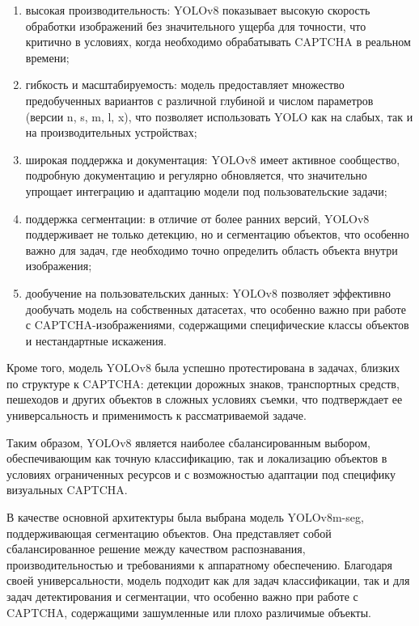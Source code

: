 \begin{enumerate}
    \item высокая производительность: YOLOv8 показывает высокую скорость 
    обработки изображений без значительного ущерба для точности, что критично в 
    условиях, когда необходимо обрабатывать CAPTCHA в реальном времени;
    \item гибкость и масштабируемость: модель предоставляет множество 
    предобученных вариантов с различной глубиной и числом параметров (версии n, 
    s, m, l, x), что позволяет использовать YOLO как на слабых, так и на 
    производительных устройствах;
    \item широкая поддержка и документация: YOLOv8 имеет активное сообщество, 
    подробную документацию и регулярно обновляется, что значительно упрощает 
    интеграцию и адаптацию модели под пользовательские задачи;
    \item поддержка сегментации: в отличие от более ранних версий, YOLOv8 
    поддерживает не только детекцию, но и сегментацию объектов, что особенно 
    важно для задач, где необходимо точно определить область объекта внутри 
    изображения;
    \item дообучение на пользовательских данных: YOLOv8 позволяет эффективно 
    дообучать модель на собственных датасетах, что особенно важно при работе с 
    CAPTCHA-изображениями, содержащими специфические классы объектов и 
    нестандартные искажения.
\end{enumerate}

Кроме того, модель YOLOv8 была успешно протестирована в задачах, близких по 
структуре к CAPTCHA: детекции дорожных знаков, транспортных средств, пешеходов и 
других объектов в сложных условиях съемки, что подтверждает ее универсальность и 
применимость к рассматриваемой задаче.

Таким образом, YOLOv8 является наиболее сбалансированным выбором, обеспечивающим 
как точную классификацию, так и локализацию объектов в условиях ограниченных 
ресурсов и с возможностью адаптации под специфику визуальных CAPTCHA.

В качестве основной архитектуры была выбрана модель YOLOv8m-seg, поддерживающая 
сегментацию объектов. Она представляет собой сбалансированное решение между 
качеством распознавания, производительностью и требованиями к аппаратному 
обеспечению. Благодаря своей универсальности, модель подходит как для задач 
классификации, так и для задач детектирования и сегментации, что особенно важно 
при работе с CAPTCHA, содержащими зашумленные или плохо различимые объекты.

